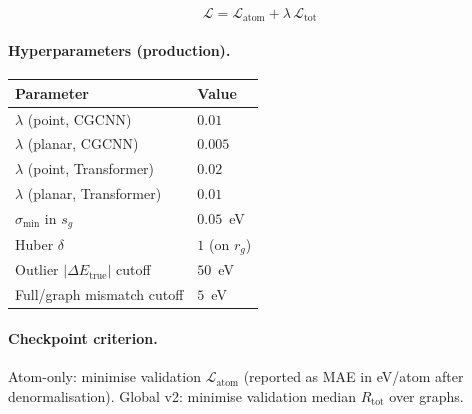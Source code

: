 \documentclass[11pt,a4paper]{article}
\newcommand{\dEtrue}{\Delta E_{\mathrm{true}}}
\begin{document}
\begin{equation}
  \boxed{
  \mathcal{L}
  = \mathcal{L}_{\mathrm{atom}}
  + \lambda\,\mathcal{L}_{\mathrm{tot}}
  }
\end{equation}

\paragraph{Hyperparameters (production).}
\begin{center}
\small
\begin{tabular}{@{}ll@{}}
  \toprule
  Parameter & Value \\
  \midrule
  $\lambda$ (point, CGCNN)  & $0.01$ \\
  $\lambda$ (planar, CGCNN) & $0.005$ \\
  $\lambda$ (point, Transformer)  & $0.02$ \\
  $\lambda$ (planar, Transformer) & $0.01$ \\
  $\sigma_{\min}$ in $s_g$ & $0.05$~eV \\
  Huber $\delta$ & $1$ (on $r_g$) \\
  Outlier $|\dEtrue|$ cutoff & $50$~eV \\
  Full/graph mismatch cutoff & $5$~eV \\
  \bottomrule
\end{tabular}
\end{center}

\paragraph{Checkpoint criterion.}
Atom-only: minimise validation $\mathcal{L}_{\mathrm{atom}}$ (reported as MAE in eV/atom after denormalisation). Global v2: minimise validation median $R_{\mathrm{tot}}$ over graphs.
\end{document}
